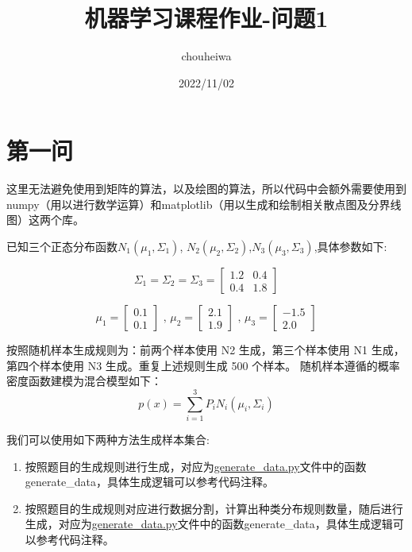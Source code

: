 \documentclass[UTF8]{article} %
\title{机器学习课程作业-问题1}
\author{chouheiwa}
\date{2022/11/02}
\begin{document}
    \maketitle
    \tableofcontents


    \section{第一问}
    这里无法避免使用到矩阵的算法，以及绘图的算法，所以代码中会额外需要使用到numpy（用以进行数学运算）和matplotlib（用以生成和绘制相关散点图及分界线图）这两个库。

    已知三个正态分布函数$N_1(\mu_1, \Sigma_1)$, $N_2(\mu_2, \Sigma_2)$,$N_3(\mu_3, \Sigma_3)$,具体参数如下:

    \[
        \Sigma_1 = \Sigma_2 = \Sigma_3 = \left[
            \begin{matrix}
                1.2 & 0.4 \\
                0.4 & 1.8
            \end{matrix}
            \right]
    \]

    \[
        \mu_1 =  \left[
            \begin{matrix}
                0.1 \\
                0.1
            \end{matrix}
            \right]\text{ , }
        \mu_2 =  \left[
            \begin{matrix}
                2.1 \\
                1.9
            \end{matrix}
            \right]\text{ , }
        \mu_3 = \left[
            \begin{matrix}
                -1.5 \\
                2.0
            \end{matrix}
            \right]
    \]

    按照随机样本生成规则为：前两个样本使用 N2 生成，第三个样本使用 N1 生成，第四个样本使用 N3 生成。重复上述规则生成 500 个样本。
    随机样本遵循的概率密度函数建模为混合模型如下：
    \[
        p(x) = \sum_{i=1}^3 P_i N_i(\mu_i, \Sigma_i)
    \]

    我们可以使用如下两种方法生成样本集合:
    \begin{enumerate}
        \item 按照题目的生成规则进行生成，对应为\href{run:generate_data.py}{generate\_data.py}文件中的函数generate\_data，具体生成逻辑可以参考代码注释。
        \item 按照题目的生成规则对应进行数据分割，计算出种类分布规则数量，随后进行生成，对应为\href{run:generate_data.py}{generate\_data.py}文件中的函数generate\_data，具体生成逻辑可以参考代码注释。
    \end{enumerate}
\end{document}
